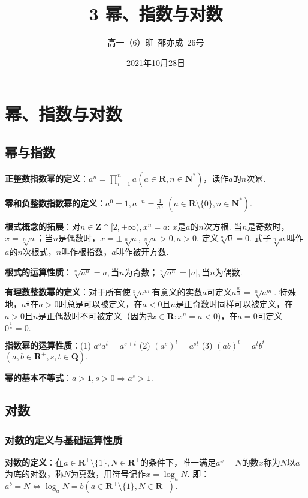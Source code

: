 \documentclass[8pt]{article}
\title{3 幂、指数与对数}
\author{高一（6）班\ 邵亦成\ 26号}
\date{2021年10月28日}
\begin{document}
	\maketitle

	\section{幂、指数与对数}
		\subsection{幂与指数}
			\textbf{正整数指数幂的定义}：$\displaystyle a^n=\prod_{i=1}^{n}{a} (a \in \mathbf{R}, n\in \mathbf{N}^{*})$，读作$a$的$n$次幂.

			\textbf{零和负整数指数幂的定义}：$a^0=1, a^{-n}=\displaystyle\frac{1}{a^n}$ $(a\in\mathbf{R} \setminus \{0\}, n\in\mathbf{N}^{*}).$

			\textbf{根式概念的拓展}：对$n\in\mathbf{Z} \cap [2, +\infty), x^n=a$: $x$是$a$的$n$次方根. 当$n$是奇数时，$x=\sqrt[n]{a}$；当$n$是偶数时，$x=\pm\sqrt[n]{a}, \sqrt[n]{a}>0, a>0$. 定义$\sqrt[n]{0}=0$. 式子$\sqrt[n]{a}$叫作$a$的$n$次根式，$n$叫作根指数，$a$叫作被开方数.

			\textbf{根式的运算性质}：$\sqrt[n]{a^n}=a, $当$n$为奇数；$\sqrt[n]{a^n}=|a|, $当$n$为偶数.

			\textbf{有理数整数幂的定义}：对于所有使$\displaystyle \sqrt[n]{a^m}$有意义的实数$a$可定义$\displaystyle a^\frac{m}{n}=\sqrt[n]{a^m}.$ 特殊地，$a^\frac{1}{n}$在$a>0$时总是可以被定义，在$a<0$且$n$是正奇数时同样可以被定义，在$a>0$且$n$是正偶数时不可被定义（因为$\nexists x\in\mathbf{R}: x^n=a<0)$，在$a=0$可定义$0^{\frac{1}{n}}=0.$

			\textbf{指数幂的运算性质}：(1) $a^s a^t=a^{s+t}$ (2) $\left(a^s\right)^t=a^{st}$ (3) $(ab)^t=a^t b^t$ $(a,b \in \mathbf{R}^{+}, s, t\in \mathbf{Q}).$

			\textbf{幂的基本不等式}：$a>1, s>0 \Rightarrow a^s>1.$

		\newpage
		\subsection{对数}
			\subsubsection{对数的定义与基础运算性质}
				\textbf{对数的定义}：在$a\in \mathbf{R}^{+} \setminus \{1\}, N\in \mathbf{R}^{+}$的条件下，唯一满足$a^x=N$的数$x$称为$N$以$a$为底的对数，称$N$为真数，用符号记作$x=\log_a{N}$. 即：$a^b=N \Leftrightarrow \log_{a}{N}=b (a\in \mathbf{R}^{+} \setminus \{1\}, N\in \mathbf{R}^{+}).$
\end{document}
